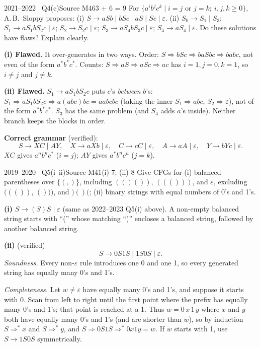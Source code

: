 \documentclass[11pt,a4paper]{article}
\newcommand{\eps}{\varepsilon}
\begin{document}
\begin{question}{2021--2022 \textbullet\ Q4(c)}{Source M46}{3 + 6 = 9}
For $\{a^ib^jc^k\mid i=j \text{ or } j=k;\ i,j,k\ge0\}$, A.\,B.\ Sloppy proposes:
(i) $S\to aSb\mid bSc\mid aS\mid Sc\mid\eps$.
(ii) $S_0\to S_1\mid S_3$; $S_1\to aS_1bS_2c\mid\eps$; $S_2\to S_2c\mid\eps$; $S_3\to aS_4bS_3c\mid\eps$; $S_4\to aS_4\mid\eps$.
Do these solutions have flaws? Explain clearly.
\end{question}
\begin{solution}
\textbf{(i) Flawed.} It over-generates in two ways. Order: $S\Rightarrow bSc\Rightarrow baSbc\Rightarrow babc$, not even of the form $a^*b^*c^*$. Counts: $S\Rightarrow aS\Rightarrow aSc\Rightarrow ac$ has $i=1,j=0,k=1$, so $i\neq j$ and $j\neq k$.

\textbf{(ii) Flawed.} $S_1\to aS_1bS_2c$ puts $c$'s \emph{between} $b$'s: $S_1\Rightarrow aS_1bS_2c\Rightarrow a(abc)bc=aabcbc$ (taking the inner $S_1\Rightarrow abc$, $S_2\Rightarrow\eps$), not of the form $a^*b^*c^*$. $S_3$ has the same problem (and $S_4$ adds $a$'s inside). Neither branch keeps the blocks in order.

\textbf{Correct grammar} (verified):
\[ S\to XC\mid AY,\quad X\to aXb\mid\eps,\quad C\to cC\mid\eps,\quad A\to aA\mid\eps,\quad Y\to bYc\mid\eps. \]
$XC$ gives $a^nb^nc^*$ ($i=j$); $AY$ gives $a^*b^nc^n$ ($j=k$).
\end{solution}

\begin{question}{2019--2020 \textbullet\ Q5(i--ii)}{Source M41}{(i) 7; (ii) 8}
Give CFGs for (i) balanced parentheses over $\{(,)\}$, including $(()())$, $((()))$, and $\eps$, excluding $((())$, $()))$, and $)()($; (ii) binary strings with equal numbers of 0's and 1's.
\end{question}
\begin{solution}
\textbf{(i)} $S\to(S)S\mid\eps$ (same as 2022--2023 Q5(i) above). A non-empty balanced string starts with ``('' whose matching ``)'' encloses a balanced string, followed by another balanced string.

\textbf{(ii)} (verified)
\[ S\to0S1S\mid1S0S\mid\eps. \]
\emph{Soundness.} Every non-$\eps$ rule introduces one 0 and one 1, so every generated string has equally many 0's and 1's.

\emph{Completeness.} Let $w\neq\eps$ have equally many 0's and 1's, and suppose it starts with 0. Scan from left to right until the first point where the prefix has equally many 0's and 1's; that point is reached at a 1. Thus $w=0\,x\,1\,y$ where $x$ and $y$ both have equally many 0's and 1's (and are shorter than $w$), so by induction $S\Rightarrow^*x$ and $S\Rightarrow^*y$, and $S\Rightarrow0S1S\Rightarrow^*0x1y=w$. If $w$ starts with 1, use $S\to1S0S$ symmetrically.
\end{solution}
\end{document}
